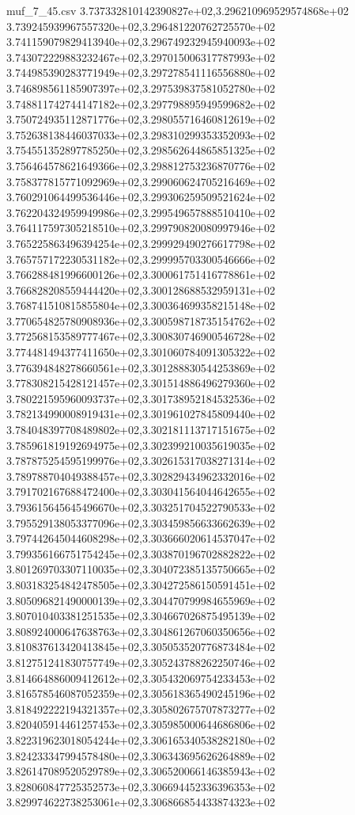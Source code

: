 \begin{filecontents*}{muf_7_45.csv}
3.737332810142390827e+02,3.296210969529574868e+02
3.739245939967557320e+02,3.296481220762725570e+02
3.741159079829413940e+02,3.296749232945940093e+02
3.743072229883232467e+02,3.297015006317787993e+02
3.744985390283771949e+02,3.297278541116556880e+02
3.746898561185907397e+02,3.297539837581052780e+02
3.748811742744147182e+02,3.297798895949599682e+02
3.750724935112871776e+02,3.298055716460812619e+02
3.752638138446037033e+02,3.298310299353352093e+02
3.754551352897785250e+02,3.298562644865851325e+02
3.756464578621649366e+02,3.298812753236870776e+02
3.758377815771092969e+02,3.299060624705216469e+02
3.760291064499536446e+02,3.299306259509521624e+02
3.762204324959949986e+02,3.299549657888510410e+02
3.764117597305218510e+02,3.299790820080997946e+02
3.765225863496394254e+02,3.299929490276617798e+02
3.765757172230531182e+02,3.299995703300546666e+02
3.766288481996600126e+02,3.300061751416778861e+02
3.766828208559444420e+02,3.300128688532959131e+02
3.768741510815855804e+02,3.300364699358215148e+02
3.770654825780908936e+02,3.300598718735154762e+02
3.772568153589777467e+02,3.300830746900546728e+02
3.774481494377411650e+02,3.301060784091305322e+02
3.776394848278660561e+02,3.301288830544253869e+02
3.778308215428121457e+02,3.301514886496279360e+02
3.780221595960093737e+02,3.301738952184532536e+02
3.782134990008919431e+02,3.301961027845809440e+02
3.784048397708489802e+02,3.302181113717151675e+02
3.785961819192694975e+02,3.302399210035619035e+02
3.787875254595199976e+02,3.302615317038271314e+02
3.789788704049388457e+02,3.302829434962332016e+02
3.791702167688472400e+02,3.303041564044642655e+02
3.793615645645496670e+02,3.303251704522790533e+02
3.795529138053377096e+02,3.303459856633662639e+02
3.797442645044608298e+02,3.303666020614537047e+02
3.799356166751754245e+02,3.303870196702882822e+02
3.801269703307110035e+02,3.304072385135750665e+02
3.803183254842478505e+02,3.304272586150591451e+02
3.805096821490000139e+02,3.304470799984655969e+02
3.807010403381251535e+02,3.304667026875495139e+02
3.808924000647638763e+02,3.304861267060350656e+02
3.810837613420413845e+02,3.305053520776873484e+02
3.812751241830757749e+02,3.305243788262250746e+02
3.814664886009412612e+02,3.305432069754233453e+02
3.816578546087052359e+02,3.305618365490245196e+02
3.818492222194321357e+02,3.305802675707873277e+02
3.820405914461257453e+02,3.305985000644686806e+02
3.822319623018054244e+02,3.306165340538282180e+02
3.824233347994578480e+02,3.306343695626264889e+02
3.826147089520529789e+02,3.306520066146385943e+02
3.828060847725352573e+02,3.306694452336396353e+02
3.829974622738253061e+02,3.306866854433874323e+02

\end{filecontents*}
